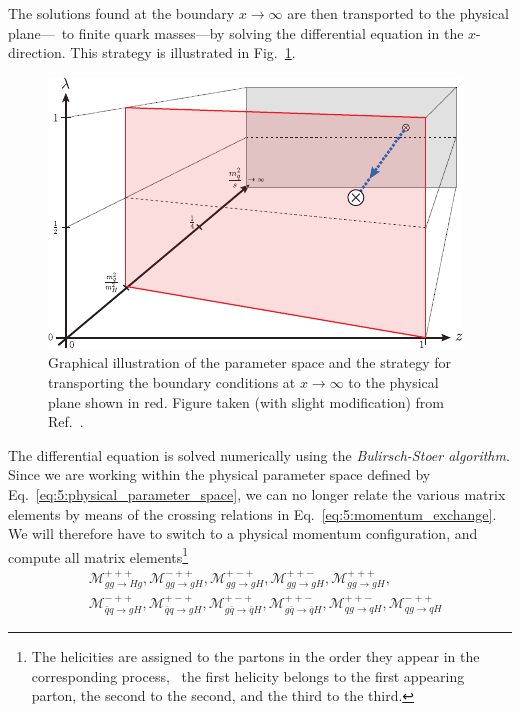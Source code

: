 The solutions found at the boundary $x \rightarrow \infty$ are then transported to the physical plane---\ie\ to finite quark masses---by solving the differential equation in the $x$-direction. This strategy is illustrated in Fig.~\ref{fig:5:integration3D}.
\begin{figure}[ht]
\centering
\includegraphics[width=\figurewidth]{Images/integration3D_no_threshold.pdf}
\caption{Graphical illustration of the parameter space and the strategy for transporting the boundary conditions at $x \rightarrow \infty$ to the physical plane shown in red. Figure taken (with slight modification) from Ref.~\cite{Niggetiedt:2023ywb}.}
\label{fig:5:integration3D}
\end{figure}
The differential equation is solved numerically using the \textit{Bulirsch-Stoer algorithm}. Since we are working within the physical parameter space defined by Eq.~\eqref{eq:5:physical_parameter_space}, we can no longer relate the various matrix elements by means of the crossing relations in Eq.~\eqref{eq:5:momentum_exchange}. We will therefore have to switch to a physical momentum configuration, and compute all matrix elements\footnote{The helicities are assigned to the partons in the order they appear in the corresponding process, \ie\ the first helicity belongs to the first appearing parton, the second to the second, and the third to the third.}
\begin{equation}
\begin{split}
&\mathcal{M}_{gg \rightarrow H g}^{+++}, \mathcal{M}_{gg \rightarrow g H }^{-++}, \mathcal{M}_{gg \rightarrow gH}^{+-+}, \mathcal{M}_{gg \rightarrow gH}^{++-}, \mathcal{M}_{gg \rightarrow gH }^{+++}, \\
&\mathcal{M}_{\bar{q} q \rightarrow gH }^{-++}, \mathcal{M}_{\bar{q} q \rightarrow gH }^{+-+}, \mathcal{M}_{g\bar{q} \rightarrow \bar{q}H}^{+-+}, \mathcal{M}_{g\bar{q} \rightarrow \bar{q}H}^{++-}, \mathcal{M}_{qg \rightarrow q H}^{++-}, \mathcal{M}_{qg \rightarrow q H}^{-++}
\end{split}
\end{equation}
